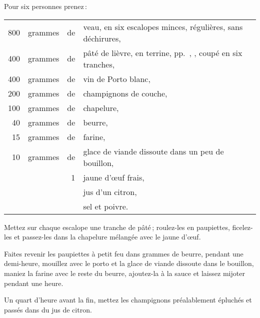 Pour six personnes prenez :

\medskip

\footnotesize
\begin{longtable}{rrrp{16em}}
    800 & grammes & de & veau, en six escalopes minces, régulières, sans déchirures,                      \\
    400 & grammes & de & pâté de lièvre, en terrine, pp. \hyperlink{p0672}{\pageref{pg0672}}, 
                         \hyperlink{p0673}{\pageref{pg0673}}, coupé en six tranches,                      \\
    400 & grammes & de & vin de Porto blanc,                                                              \\
    200 & grammes & de & champignons de couche,                                                           \\
    100 & grammes & de & chapelure,                                                                       \\
     40 & grammes & de & beurre,                                                                          \\
     15 & grammes & de & farine,                                                                          \\
     10 & grammes & de & glace de viande dissoute dans un peu de bouillon,                                \\
        &         &  1 & jaune d'œuf frais,                                                               \\
        &         &    & jus d'un citron,                                                                 \\
        &         &    & sel et poivre.                                                                   \\
\end{longtable}
\normalsize

Mettez sur chaque escalope une tranche de pâté ; roulez-les en paupiettes,
ficelez-les et passez-les dans la chapelure mélangée avec le jaune d'œuf.

Faites revenir les paupiettes à petit feu dans {\mmm} grammes de beurre, pendant
une demi-heure, mouillez avec le porto et la glace de viande dissoute dans le
bouillon, maniez la farine avec le reste du beurre, ajoutez-la à la sauce et
laissez mijoter pendant une heure.

Un quart d'heure avant la fin, mettez les champignons préalablement épluchés
et passés dans du jus de citron.

